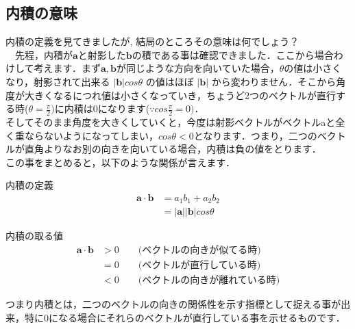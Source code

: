 \documentclass[11pt,a4paper,uplatex]{ujreport}
\begin{document}
\subsection{内積の意味}
内積の定義を見てきましたが, 結局のところその意味は何でしょう？\\
　先程，内積が$\mathbf{a}$と射影した$\mathbf{b}$の積である事は確認できました．ここから場合わけして考えます．まず$\mathbf{a,b}$が同じような方向を向いていた場合，$\theta$の値は小さくなり，射影されて出来る $|\mathbf{b}|cos\theta$ の値はほぼ $| \mathbf{b}|$ から変わりません．そこから角度が大きくなるにつれ値は小さくなっていき，ちょうど2つのベクトルが直行する時($\theta = \frac{\pi}{2})$に内積は0になります($\because cos\frac{\pi}{2}=0)$．\\

そしてそのまま角度を大きくしていくと，今度は射影ベクトルがベクトルaと全く重ならないようになってしまい，$cos\theta < 0$となります．つまり，二つのベクトルが直角よりなお別の向きを向いている場合，内積は負の値をとります．\\

この事をまとめると，以下のような関係が言えます．

\begin{screen}
内積の定義
\begin{align}
  \mathbf{a}\cdot\mathbf{b} &= a_1b_1 + a_2b_2\\
&= |\mathbf{a}||\mathbf{b}|cos\theta 
\end{align}

内積の取る値
\begin{align}
\mathbf{a}\cdot \mathbf{b} &> 0 \qquad \text{(ベクトルの向きが似てる時)}\\
&=0 \qquad \text{(ベクトルが直行している時)}\\
&<0 \qquad \text{(ベクトルの向きが離れている時)}
\end{align}

\end{screen}

つまり内積とは，二つのベクトルの向きの関係性を示す指標として捉える事が出来，特に0になる場合にそれらのベクトルが直行している事を示せるものです．
\end{document}
